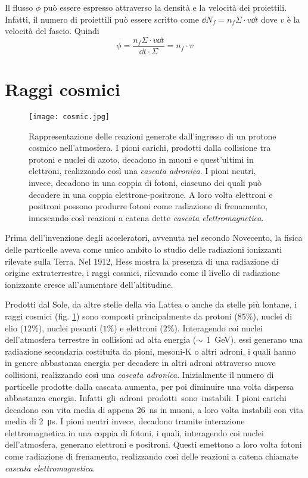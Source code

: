 \documentclass[../main.tex]{subfiles}
\begin{document}
Il flusso $\phi$ può essere espresso attraverso la densità e la velocità dei proiettili. Infatti, il numero di proiettili può essere scritto come $\dd N_f = n_f \Sigma \cdot v \dd t$ dove $v$ è la velocità del fascio. Quindi 
\begin{equation}
    \phi = \frac{n_f \Sigma \cdot v \dd t}{\dd t \cdot \Sigma} = n_f \cdot v
\end{equation}

\section{Raggi cosmici}

\begin{figure}[!b]
    \centering
    \texttt{[image: cosmic.jpg]}
    \caption{Rappresentazione delle reazioni generate dall'ingresso di un protone cosmico nell'atmosfera. I pioni carichi, prodotti dalla collisione tra protoni e nuclei di azoto, decadono in muoni e quest'ultimi in elettroni, realizzando così una \emph{cascata adronica}. I pioni neutri, invece, decadono in una coppia di fotoni, ciascuno dei quali può decadere in una coppia elettrone-positrone. A loro volta elettroni e positroni possono produrre fotoni come radiazione di frenamento, innescando così reazioni a catena dette \emph{cascata elettromagnetica}.
    \cite{as10_vdu}}
    \label{fig:cosmic}
\end{figure}

Prima dell'invenzione degli acceleratori, avvenuta nel secondo Novecento, la fisica delle particelle aveva come unico ambito lo studio delle radiazioni ionizzanti rilevate sulla Terra.
Nel 1912, Hess mostra la presenza di una radiazione di origine extraterrestre, i raggi cosmici, rilevando come il livello di radiazione ionizzante cresce all'aumentare dell'altitudine.

Prodotti dal Sole, da altre stelle della via Lattea o anche da stelle più lontane, i raggi cosmici (fig. \ref{fig:cosmic}) sono composti principalmente da protoni ($85\%$), nuclei di elio ($12\%$), nuclei pesanti ($1\%$) e elettroni ($2\%$). Interagendo coi nuclei dell'atmosfera terrestre in collisioni ad alta energia ($\small \sim$ \SI{1}{\GeV}), essi generano una radiazione secondaria costituita da pioni, mesoni-K o altri adroni, i quali hanno in genere abbastanza energia per decadere in altri adroni attraverso nuove collisioni, realizzando così una \emph{cascata adronica}. Inizialmente il numero di particelle prodotte dalla cascata aumenta, per poi diminuire una volta dispersa abbastanza energia. \mbox{Infatti gli adroni prodotti sono instabili.} I pioni carichi decadono con vita media di appena \SI{26}{\ns} in muoni, a loro volta instabili con vita media di \SI{2}{\micro\s}. I pioni neutri invece, decadono tramite interazione elettromagnetica in una coppia di fotoni, i quali, interagendo coi nuclei dell'atmosfera, generano elettroni e positroni. Questi emettono a loro volta fotoni come radiazione di frenamento, realizzando così delle reazioni a catena chiamate \emph{cascata elettromagnetica}.
\end{document}
